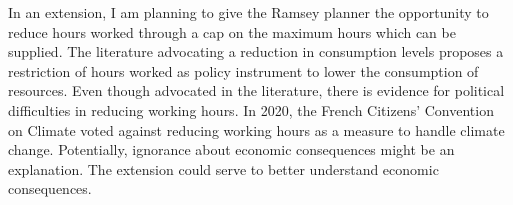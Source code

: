 
In an extension, I am planning to give the Ramsey planner the opportunity to reduce hours worked through a cap on the maximum hours which can be supplied. The literature advocating a reduction in consumption levels \cite{Schor2005SustainableReduction} proposes a restriction of hours worked as policy instrument to lower the consumption of resources.
Even though advocated in the literature, there is evidence for political difficulties in reducing working hours. In 2020, the French Citizens' Convention on Climate voted against reducing working hours as a measure to handle climate change. Potentially, ignorance about economic consequences might be an explanation. The extension could serve to better understand economic consequences. 



\begin{comment}
\paragraph{Extension: What if the low skilled get a higher share \ar they reduce even less \ar more fossil input supply}

Redistribution to households with a higher marginal propensity to consume emissions counteracts the externality. This effect is amplified by a market size effect  of dirty goods. 

content...
\end{comment}


